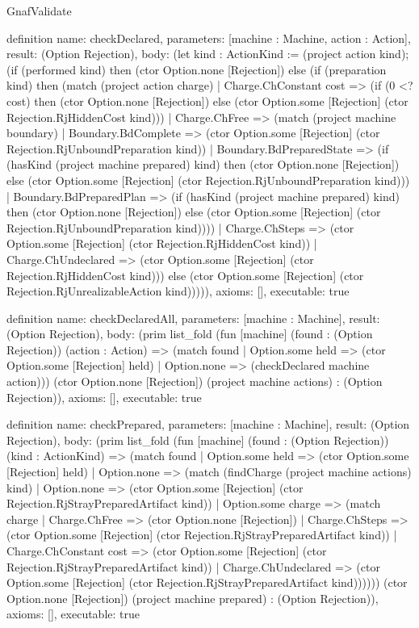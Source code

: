 \begin{lexlean}{GnafValidate}
\begin{semanticmodule}
definition{
  name: checkDeclared,
  parameters: [machine : Machine, action : Action],
  result: (Option Rejection),
  body: (let kind : ActionKind := (project action kind); (if (performed kind) then (ctor Option.none [Rejection]) else (if (preparation kind) then (match (project action charge)
    | Charge.ChConstant cost => (if (0 <? cost) then (ctor Option.none [Rejection]) else (ctor Option.some [Rejection] (ctor Rejection.RjHiddenCost kind)))
    | Charge.ChFree => (match (project machine boundary)
      | Boundary.BdComplete => (ctor Option.some [Rejection] (ctor Rejection.RjUnboundPreparation kind))
      | Boundary.BdPreparedState => (if (hasKind (project machine prepared) kind) then (ctor Option.none [Rejection]) else (ctor Option.some [Rejection] (ctor Rejection.RjUnboundPreparation kind)))
      | Boundary.BdPreparedPlan => (if (hasKind (project machine prepared) kind) then (ctor Option.none [Rejection]) else (ctor Option.some [Rejection] (ctor Rejection.RjUnboundPreparation kind))))
    | Charge.ChSteps => (ctor Option.some [Rejection] (ctor Rejection.RjHiddenCost kind))
    | Charge.ChUndeclared => (ctor Option.some [Rejection] (ctor Rejection.RjHiddenCost kind))) else (ctor Option.some [Rejection] (ctor Rejection.RjUnrealizableAction kind))))),
  axioms: [],
  executable: true
}

definition{
  name: checkDeclaredAll,
  parameters: [machine : Machine],
  result: (Option Rejection),
  body: (prim list_fold (fun [machine] (found : (Option Rejection)) (action : Action) => (match found
    | Option.some held => (ctor Option.some [Rejection] held)
    | Option.none => (checkDeclared machine action))) (ctor Option.none [Rejection]) (project machine actions) : (Option Rejection)),
  axioms: [],
  executable: true
}

definition{
  name: checkPrepared,
  parameters: [machine : Machine],
  result: (Option Rejection),
  body: (prim list_fold (fun [machine] (found : (Option Rejection)) (kind : ActionKind) => (match found
    | Option.some held => (ctor Option.some [Rejection] held)
    | Option.none => (match (findCharge (project machine actions) kind)
      | Option.none => (ctor Option.some [Rejection] (ctor Rejection.RjStrayPreparedArtifact kind))
      | Option.some charge => (match charge
        | Charge.ChFree => (ctor Option.none [Rejection])
        | Charge.ChSteps => (ctor Option.some [Rejection] (ctor Rejection.RjStrayPreparedArtifact kind))
        | Charge.ChConstant cost => (ctor Option.some [Rejection] (ctor Rejection.RjStrayPreparedArtifact kind))
        | Charge.ChUndeclared => (ctor Option.some [Rejection] (ctor Rejection.RjStrayPreparedArtifact kind)))))) (ctor Option.none [Rejection]) (project machine prepared) : (Option Rejection)),
  axioms: [],
  executable: true
}


\end{semanticmodule}
\end{lexlean}
